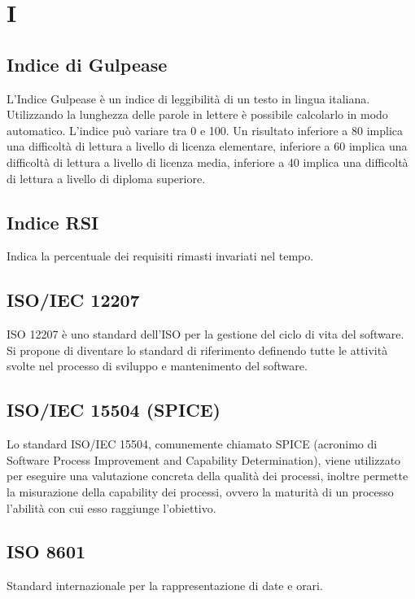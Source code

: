 {	\section{I}
	\subsection{Indice di Gulpease}
	L'Indice Gulpease è un indice di leggibilità di un testo in lingua italiana. Utilizzando la lunghezza delle parole in lettere è possibile calcolarlo in modo automatico. L'indice può variare tra 0 e 100. Un risultato inferiore a 80 implica una difficoltà di lettura a livello di licenza elementare, inferiore a 60 implica una difficoltà di lettura a livello di licenza media, inferiore a 40 implica una difficoltà di lettura a livello di diploma superiore.
	
	\subsection{Indice RSI}
	Indica la percentuale dei requisiti rimasti invariati nel tempo.
	
	\subsection{ISO/IEC 12207}
	ISO 12207 è uno standard dell'ISO per la gestione del ciclo di vita del software. Si propone di diventare lo standard di riferimento definendo tutte le attività svolte nel processo di sviluppo e mantenimento del software.
	
	\subsection{ISO/IEC 15504 (SPICE)}
	Lo standard ISO/IEC 15504, comunemente chiamato SPICE (acronimo di Software Process Improvement and Capability Determination), viene utilizzato per eseguire una valutazione concreta della qualità dei processi, inoltre permette la misurazione della capability dei processi, ovvero la maturità
	di un processo l’abilità con cui esso raggiunge l’obiettivo.
	
	\subsection{ISO 8601}
	Standard internazionale per la rappresentazione di date e orari.
	
}
